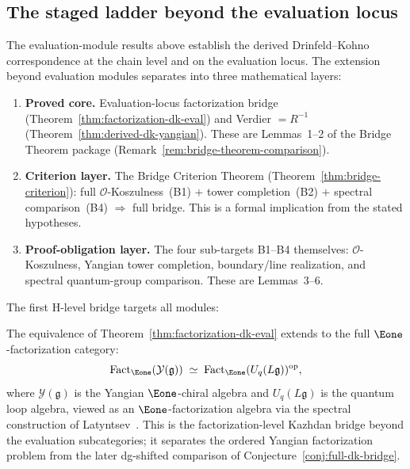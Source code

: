 \subsection{The staged ladder beyond the evaluation locus}
\label{subsec:staged-ladder}

The evaluation-module results above establish the derived
Drinfeld--Kohno correspondence at the chain level and on the
evaluation locus. The extension beyond evaluation modules separates
into three mathematical layers:
\begin{enumerate}[label=\textup{(\Roman*)}]
\item \textbf{Proved core.}
 Evaluation-locus factorization bridge
 (Theorem~\ref{thm:factorization-dk-eval})
 and Verdier $= R^{-1}$
 (Theorem~\ref{thm:derived-dk-yangian}).
 These are Lemmas~1--2 of the Bridge Theorem package
 (Remark~\ref{rem:bridge-theorem-comparison}).
\item \textbf{Criterion layer.}
 The Bridge Criterion Theorem
 (Theorem~\ref{thm:bridge-criterion}):
 full $\mathcal{O}$-Koszulness~(B1)
 $+$ tower completion~(B2)
 $+$ spectral comparison~(B4)
 $\Rightarrow$ full bridge.
 This is a formal implication from the stated hypotheses.
\item \textbf{Proof-obligation layer.}
 The four sub-targets B1--B4 themselves:
 $\mathcal{O}$-Koszulness,
 Yangian tower completion,
 boundary/line realization, and
 spectral quantum-group comparison.
 These are Lemmas~3--6.
\end{enumerate}
The first H-level bridge targets all modules:

\begin{conjecture}\label{conj:full-derived-dk}
The equivalence of
Theorem~\textup{\ref{thm:factorization-dk-eval}} extends to the
full $\Eone$-factorization category:
\begin{equation}\label{eq:full-dk}
\operatorname{Fact}_{\Eone}(\mathcal{Y}(\mathfrak{g}))
\;\simeq\;
\operatorname{Fact}_{\Eone}(U_q(L\mathfrak{g}))^{\mathrm{op}},
\end{equation}
where $\mathcal{Y}(\mathfrak{g})$ is the Yangian
$\Eone$-chiral algebra and $U_q(L\mathfrak{g})$ is the quantum
loop algebra, viewed as an $\Eone$-factorization algebra via the
spectral construction of Latyntsev~\cite{Latyntsev23}.
This is the factorization-level Kazhdan bridge beyond the evaluation
subcategories; it separates the ordered Yangian factorization problem
from the later dg-shifted comparison of
Conjecture~\ref{conj:full-dk-bridge}.
\end{conjecture}

